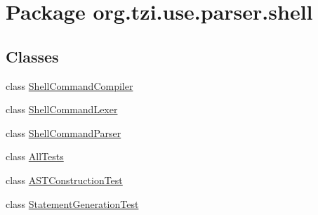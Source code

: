 \hypertarget{namespaceorg_1_1tzi_1_1use_1_1parser_1_1shell}{\section{Package org.\-tzi.\-use.\-parser.\-shell}
\label{namespaceorg_1_1tzi_1_1use_1_1parser_1_1shell}
}
\subsection*{Classes}
\begin{DoxyCompactItemize}
\item 
class \hyperlink{classorg_1_1tzi_1_1use_1_1parser_1_1shell_1_1_shell_command_compiler}{Shell\-Command\-Compiler}
\item 
class \hyperlink{classorg_1_1tzi_1_1use_1_1parser_1_1shell_1_1_shell_command_lexer}{Shell\-Command\-Lexer}
\item 
class \hyperlink{classorg_1_1tzi_1_1use_1_1parser_1_1shell_1_1_shell_command_parser}{Shell\-Command\-Parser}
\item 
class \hyperlink{classorg_1_1tzi_1_1use_1_1parser_1_1shell_1_1_all_tests}{All\-Tests}
\item 
class \hyperlink{classorg_1_1tzi_1_1use_1_1parser_1_1shell_1_1_a_s_t_construction_test}{A\-S\-T\-Construction\-Test}
\item 
class \hyperlink{classorg_1_1tzi_1_1use_1_1parser_1_1shell_1_1_statement_generation_test}{Statement\-Generation\-Test}
\end{DoxyCompactItemize}
